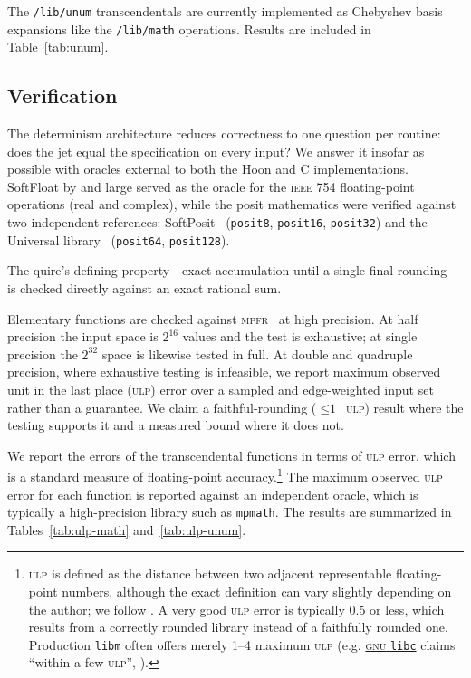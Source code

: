 \documentclass[twoside]{article}
\begin{document}
The \texttt{/lib/unum} transcendentals are currently implemented as Chebyshev basis expansions like the \texttt{/lib/math} operations.  Results are included in Table~\ref{tab:unum}.

\subsection{Verification}
\label{sec:verify}

The determinism architecture reduces correctness to one question per routine:  does the jet equal the specification on every input? We answer it insofar as possible with oracles external to both the Hoon and C implementations.  SoftFloat by and large served as the oracle for the \textsc{ieee} 754 floating-point operations (real and complex), while the posit mathematics were verified against two independent references:  SoftPosit~\citep{leong_softposit} (\texttt{posit8}, \texttt{posit16}, \texttt{posit32}) and the Universal library~\citep{omtzigt2020universal} (\texttt{posit64}, \texttt{posit128}).

The quire's defining property---exact accumulation until a single final rounding---is checked directly against an exact rational sum.

Elementary functions are checked against \textsc{mpfr}~\citep{fousse2007mpfr} at high precision.  At half precision the input space is $\text{2}^\text{16}$ values and the test is exhaustive; at single precision the $\text{2}^\text{32}$ space is likewise tested in full.  At double and quadruple precision, where exhaustive testing is infeasible, we report maximum observed unit in the last place (\textsc{ulp}) error over a sampled and edge-weighted input set rather than a guarantee.  We claim a faithful-rounding ($\leq \text{1}$~\textsc{ulp}) result where the testing supports it and a measured bound where it does not.

We report the errors of the transcendental functions in terms of \textsc{ulp} error, which is a standard measure of floating-point accuracy.\footnote{\textsc{ulp} is defined as the distance between two adjacent representable floating-point numbers, although the exact definition can vary slightly depending on the author; we follow \citet{MullerEtAl2018}.  A very good \textsc{ulp} error is typically 0.5 or less, which results from a correctly rounded library instead of a faithfully rounded one.  Production \texttt{libm} often offers merely 1--4 maximum \textsc{ulp} (e.g. \href{gnu.org/software/libc/manual/html_node/Errors-in-Math-Functions.html}{\textsc{gnu} \texttt{libc}} claims ``within a few \textsc{ulp}'', \citet{glibc_matherr}).}  The maximum observed \textsc{ulp} error for each function is reported against an independent oracle, which is typically a high-precision library such as \texttt{mpmath}.  The results are summarized in Tables~\ref{tab:ulp-math} and~\ref{tab:ulp-unum}.
\end{document}
